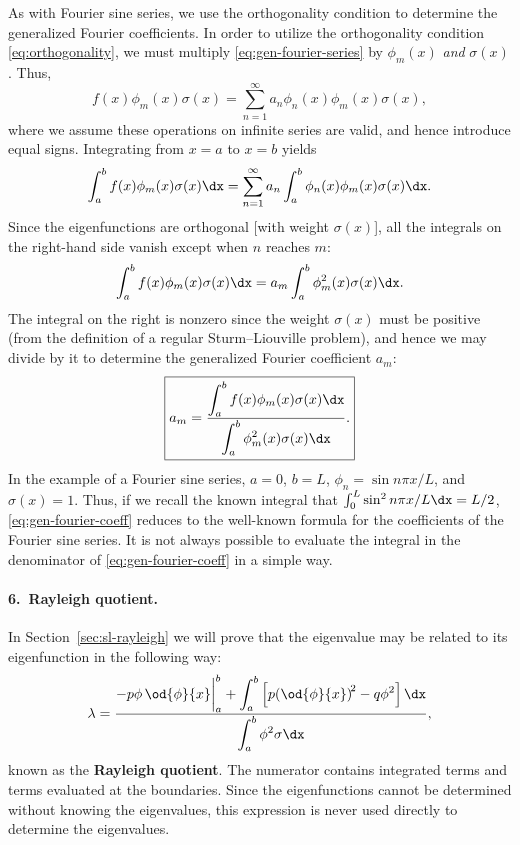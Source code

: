 As with Fourier sine series, we use the orthogonality condition to determine the generalized Fourier coefficients.  In order to utilize the orthogonality condition \eqref{eq:orthogonality}, we must multiply \eqref{eq:gen-fourier-series} by $\phi_m(x)$ \textit{and} $\sigma(x)$.  Thus,
\[
f(x)\phi_m(x)\sigma(x) = \sum_{n=1}^{\infty} a_n\phi_n(x)\phi_m(x)\sigma(x),
\]
where we assume these operations on infinite series are valid, and hence introduce equal signs.  Integrating from $x = a$ to $x = b$ yields
\[
\int_a^b f(x)\phi_m(x)\sigma(x)\dx = \sum_{n=1}^{\infty} a_n \int_a^b \phi_n(x)\phi_m(x)\sigma(x)\dx.
\]
Since the eigenfunctions are orthogonal [with weight $\sigma(x)$], all the integrals on the right-hand side vanish except when $n$ reaches $m$:
\[
\int_a^b f(x)\phi_m(x)\sigma(x)\dx = a_m \int_a^b \phi_m^2(x)\sigma(x)\dx.
\]
The integral on the right is nonzero since the weight $\sigma(x)$ must be positive (from the definition of a regular Sturm--Liouville problem), and hence we may divide by it to determine the generalized Fourier coefficient $a_m$:
\begin{equation}
\label{eq:gen-fourier-coeff}
\boxed{a_m = \frac{\displaystyle\int_a^b f(x)\phi_m(x)\sigma(x)\dx}{\displaystyle\int_a^b \phi_m^2(x)\sigma(x)\dx}.}
\end{equation}
In the example of a Fourier sine series, $a = 0$, $b = L$, $\phi_n = \sin n\pi x/L$, and $\sigma(x) = 1$.  Thus, if we recall the known integral that $\int_0^L \sin^2 n\pi x/L\dx = L/2$, \eqref{eq:gen-fourier-coeff} reduces to the well-known formula for the coefficients of the Fourier sine series.  It is not always possible to evaluate the integral in the denominator of \eqref{eq:gen-fourier-coeff} in a simple way.

\paragraph{6.\ Rayleigh quotient.}
In Section~\ref{sec:sl-rayleigh} we will prove that the eigenvalue may be related to its eigenfunction in the following way:
\begin{equation}
\label{eq:rayleigh-quotient}
\lambda = \frac{\displaystyle -p\phi\,\od{\phi}{x}\bigg|_a^b + \int_a^b \left[p\!\left(\od{\phi}{x}\right)^{\!2} - q\phi^2\right]\dx}{\displaystyle\int_a^b \phi^2\sigma\dx},
\end{equation}
known as the \textbf{Rayleigh quotient}.  The numerator contains integrated terms and terms evaluated at the boundaries.  Since the eigenfunctions cannot be determined without knowing the eigenvalues, this expression is never used directly to determine the eigenvalues.

